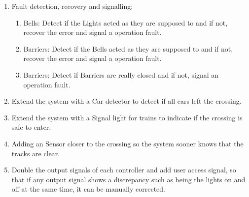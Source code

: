 \documentclass[final]{report}
\begin{document}
	\begin{enumerate}
	\item Fault detection, recovery and signalling:
		\begin{enumerate}
			\item Bells: Detect if the Lights acted as they are supposed to and if not, recover the error and signal a operation fault.
			\item Barriers: Detect if the Bells acted as they are supposed to and if not, recover the error and signal a operation fault.
			\item Barriers: Detect if Barriers are really closed and if not, signal an operation fault.
		\end{enumerate}

	\item Extend the system with a Car detector to detect if all cars left the crossing.
	\item Extend the system with a Signal light for trains to indicate if the crossing is safe to enter.
	\item Adding an Sensor closer to the crossing so the system sooner knows that the tracks are clear.
	\item Double the output signals of each controller and add user access signal, so that if any output signal shows a discrepancy such as being the lights on and off at the same time, it can be manually corrected.
	\end{enumerate}
\end{document}
